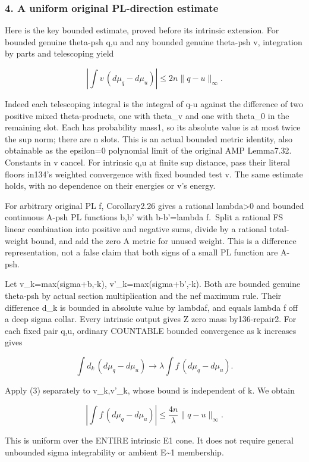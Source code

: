 \documentclass[
]{article}
\begin{document}
\subsubsection{4. A uniform original PL-direction
estimate}\label{a-uniform-original-pl-direction-estimate}

Here is the key bounded estimate, proved before its intrinsic extension.
For bounded genuine theta-psh q,u and any bounded genuine theta-psh v,
integration by parts and telescoping yield

\[\left|\int v\,(d\mu_q-d\mu_u)\right|\leq2n\|q-u\|_\infty.\tag{3}\]

Indeed each telescoping integral is the integral of q-u against the
difference of two positive mixed theta-products, one with theta\_v and
one with theta\_0 in the remaining slot. Each has probability mass1, so
its absolute value is at most twice the sup norm; there are n slots.
This is an actual bounded metric identity, also obtainable as the
epsilon=0 polynomial limit of the original AMP Lemma7.32. Constants in v
cancel. For intrinsic q,u at finite sup distance, pass their literal
floors in134's weighted convergence with fixed bounded test v. The same
estimate holds, with no dependence on their energies or v's energy.

For arbitrary original PL f, Corollary2.26 gives a rational
lambda\textgreater0 and bounded continuous A-psh PL functions b,b' with
b-b'=lambda f.~Split a rational FS linear combination into positive and
negative sums, divide by a rational total-weight bound, and add the zero
A metric for unused weight. This is a difference representation, not a
false claim that both signs of a small PL function are A-psh.

Let v\_k=max(sigma+b,-k), v'\_k=max(sigma+b',-k). Both are bounded
genuine theta-psh by actual section multiplication and the nef maximum
rule. Their difference d\_k is bounded in absolute value by
lambda\textbar\textbar f\textbar\textbar, and equals lambda f off a deep
sigma collar. Every intrinsic output gives Z zero mass by136-repair2.
For each fixed pair q,u, ordinary COUNTABLE bounded convergence as k
increases gives

\[\int d_k\,(d\mu_q-d\mu_u)\to
\lambda\int f\,(d\mu_q-d\mu_u).\]

Apply (3) separately to v\_k,v'\_k, whose bound is independent of k. We
obtain

\[\left|\int f\,(d\mu_q-d\mu_u)\right|
\leq\frac{4n}{\lambda}\|q-u\|_\infty.\tag{4}\]

This is uniform over the ENTIRE intrinsic E1 cone. It does not require
general unbounded sigma integrability or ambient E\textasciitilde1
membership.
\end{document}
